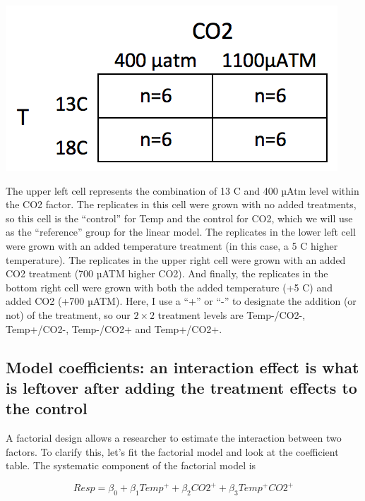 \documentclass[]{book}
\begin{document}
\includegraphics{images/2x2_table.png}

The upper left cell represents the combination of 13 C and 400 µAtm level within the CO2 factor. The replicates in this cell were grown with no added treatments, so this cell is the ``control'' for Temp and the control for CO2, which we will use as the ``reference'' group for the linear model. The replicates in the lower left cell were grown with an added temperature treatment (in this case, a 5 C higher temperature). The replicates in the upper right cell were grown with an added CO2 treatment (700 µATM higher CO2). And finally, the replicates in the bottom right cell were grown with both the added temperature (+5 C) and added CO2 (+700 µATM). Here, I use a ``+'' or ``-'' to designate the addition (or not) of the treatment, so our \(2 \times 2\) treatment levels are Temp-/CO2-, Temp+/CO2-, Temp-/CO2+ and Temp+/CO2+.

\hypertarget{model-coefficients-an-interaction-effect-is-what-is-leftover-after-adding-the-treatment-effects-to-the-control}{%
\subsection{Model coefficients: an interaction effect is what is leftover after adding the treatment effects to the control}\label{model-coefficients-an-interaction-effect-is-what-is-leftover-after-adding-the-treatment-effects-to-the-control}}

A factorial design allows a researcher to estimate the interaction between two factors. To clarify this, let's fit the factorial model and look at the coefficient table. The systematic component of the factorial model is

\begin{equation}
Resp = \beta_0 + \beta_1 Temp^+ + \beta_2 CO2^+ + \beta_3 Temp^+ CO2^+
\label{eq:factorial-full}
\end{equation}
\end{document}
